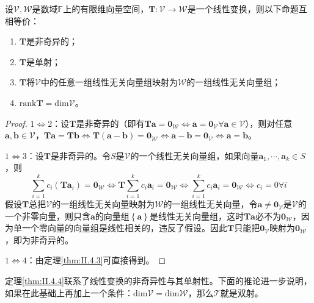 \documentclass[main.tex]{subfiles}
\begin{document}
\begin{theorem}\label{thm:II.4.4}
设$\mathcal{V},\mathcal{W}$是数域$\mathbb{F}$上的有限维向量空间，$\mathbf{T}:\mathcal{V}\rightarrow\mathcal{W}$是一个线性变换，则以下命题互相等价：
\begin{enumerate}
    \item $\mathbf{T}$是非奇异的；
    \item $\mathbf{T}$是单射；
    \item $\mathbf{T}$将$\mathcal{V}$中的任意一组线性无关向量组映射为$\mathcal{W}$的一组线性无关向量组；
    \item $\mathrm{rank}\mathbf{T}=\mathrm{dim}\mathcal{V}$。
\end{enumerate}
\end{theorem}
\begin{proof}
$1\Leftrightarrow 2$：设$\mathbf{T}$是非奇异的（即有$\mathbf{Ta}=\mathbf{0}_\mathcal{W}\Leftrightarrow\mathbf{a}=\mathbf{0}_\mathcal{V}\forall\mathbf{a}\in\mathcal{V}$），则对任意$\mathbf{a},\mathbf{b}\in\mathcal{V}$，$\mathbf{Ta}=\mathbf{Tb}\Leftrightarrow\mathbf{T}\left(\mathbf{a}-\mathbf{b}\right)=\mathbf{0}_\mathcal{W}\Leftrightarrow\mathbf{a}-\mathbf{b}=\mathbf{0}_\mathcal{V}\Leftrightarrow\mathbf{a}=\mathbf{b}$。

$1\Leftrightarrow 3$：设$\mathbf{T}$是非奇异的。令$S$是$\mathcal{V}$的一个线性无关向量组，如果向量$\mathbf{a}_1,\cdots,\mathbf{a}_k\in S$，则
\[
\sum_{i=1}^kc_i\left(\mathbf{Ta}_i\right)=\mathbf{0}_\mathcal{W}\Leftrightarrow\mathbf{T}\sum_{i=1}^kc_i\mathbf{a}_i=\mathbf{0}_\mathcal{W}\Leftrightarrow\sum_{i=1}^kc_i\mathbf{a}_i=\mathbf{0}_\mathcal{W}\Leftrightarrow c_i=0\forall i
\]
假设$\mathbf{T}$总把$\mathcal{V}$的一组线性无关向量映射为$\mathcal{W}$的一组线性无关向量，令$\mathbf{a}\neq\mathbf{0}_\mathcal{V}$是$\mathcal{V}$的一个非零向量，则只含$\mathbf{a}$的向量组$\left\{\mathbf{a}\right\}$是线性无关向量组，这时$\mathbf{Ta}$必不为$\mathbf{0}_\mathcal{W}$，因为单一个零向量的向量组是线性相关的，违反了假设。因此$\mathbf{T}$只能把$\mathbf{0}_\mathcal{V}$映射为$\mathbf{0}_\mathcal{W}$，即为非奇异的。

$1\Leftrightarrow 4$：由定理\ref{thm:II.4.3}可直接得到。
\end{proof}

定理\ref{thm:II.4.4}联系了线性变换的非奇异性与其单射性。下面的推论进一步说明，如果在此基础上再加上一个条件：$\mathrm{dim}\mathcal{V}=\mathrm{dim}\mathcal{W}$，那么$\mathcal{T}$就是双射。
\end{document}
